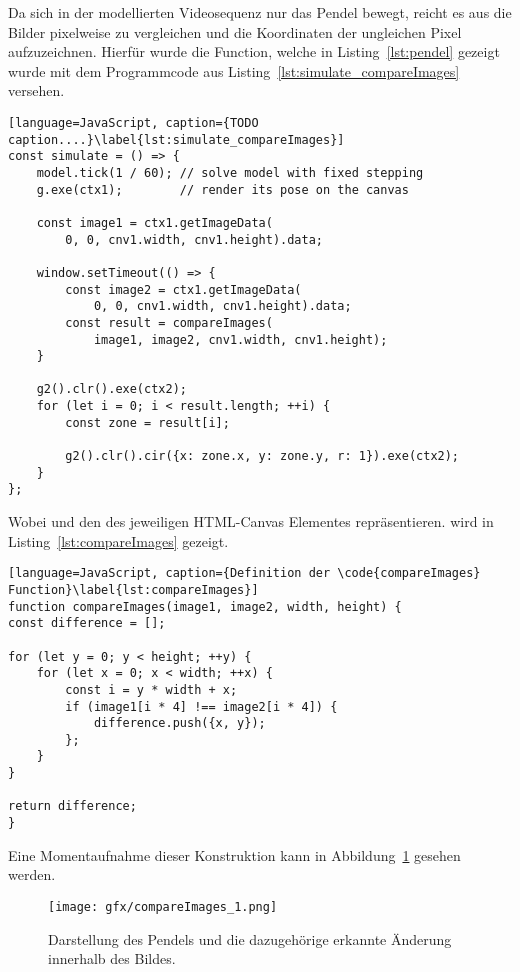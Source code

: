 Da sich in der modellierten Videosequenz nur das Pendel bewegt, reicht es aus die Bilder pixelweise zu vergleichen und die Koordinaten der ungleichen Pixel aufzuzeichnen.
Hierfür wurde die  Function, welche in Listing~\ref{lst:pendel} gezeigt wurde mit dem Programmcode aus Listing~\ref{lst:simulate_compareImages} versehen.

\begin{lstlisting}[language=JavaScript, caption={TODO caption....}\label{lst:simulate_compareImages}]
const simulate = () => {
    model.tick(1 / 60); // solve model with fixed stepping
    g.exe(ctx1);        // render its pose on the canvas

    const image1 = ctx1.getImageData(
        0, 0, cnv1.width, cnv1.height).data;

    window.setTimeout(() => {
        const image2 = ctx1.getImageData(
            0, 0, cnv1.width, cnv1.height).data;
        const result = compareImages(
            image1, image2, cnv1.width, cnv1.height);
    }

    g2().clr().exe(ctx2);
    for (let i = 0; i < result.length; ++i) {
        const zone = result[i];

        g2().clr().cir({x: zone.x, y: zone.y, r: 1}).exe(ctx2);
    }
};
\end{lstlisting}

Wobei  und  den  des jeweiligen HTML-Canvas Elementes repräsentieren.
 wird in Listing~\ref{lst:compareImages} gezeigt.

\begin{lstlisting}[language=JavaScript, caption={Definition der \code{compareImages} Function}\label{lst:compareImages}]
function compareImages(image1, image2, width, height) {
const difference = [];

for (let y = 0; y < height; ++y) {
    for (let x = 0; x < width; ++x) {
        const i = y * width + x;
        if (image1[i * 4] !== image2[i * 4]) {
            difference.push({x, y});
        };
    }
}

return difference;
}
\end{lstlisting}

Eine Momentaufnahme dieser Konstruktion kann in Abbildung~\ref{fig:compareImages} gesehen werden.

\begin{figure}[htb]
	\texttt{[image: gfx/compareImages\_1.png]}
	\caption{Darstellung des Pendels und die dazugehörige erkannte Änderung innerhalb des Bildes.}
	\label{fig:compareImages}
\end{figure}


